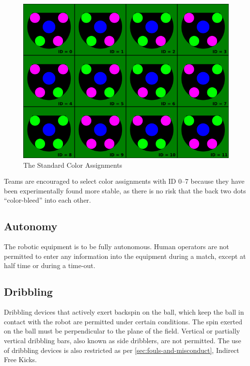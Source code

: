 \begin{figure}[ht] %
	\centering
	\includegraphics[width=1.0\columnwidth]{img/standard_colors2010.png}
	\caption{The Standard Color Assignments}
	\label{fig:stdcolors}
\end{figure}

Teams are encouraged to select color assignments with ID 0--7 because they have been experimentally found more stable, as there is no risk that the back two dots ``color-bleed'' into each other.

\subsection{Autonomy}
The robotic equipment is to be fully autonomous.
Human operators are not permitted to enter any information into the equipment during a match, except at half time or during a time-out.

\subsection{Dribbling}
Dribbling devices that actively exert backspin on the ball, which keep the ball in contact with the robot are permitted under certain conditions.
The spin exerted on the ball must be perpendicular to the plane of the field.
Vertical or partially vertical dribbling bars, also known as side dribblers, are not permitted.
The use of dribbling devices is also restricted as per \autoref{sec:fouls-and-misconduct}, Indirect Free Kicks.


